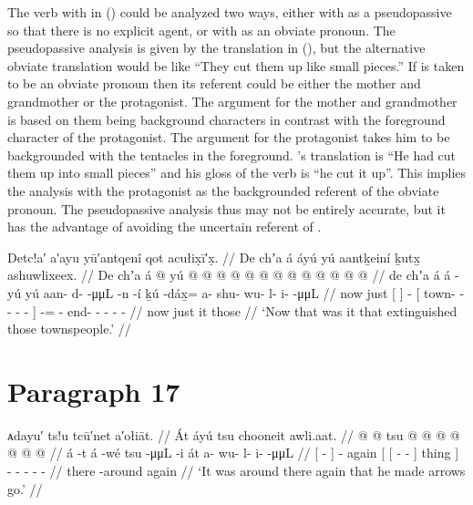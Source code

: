 The verb with  in (\lastx) could be analyzed two ways, either with  as a pseudopassive so that there is no explicit agent, or with  as an obviate pronoun.
The pseudopassive analysis is given by the translation in (\lastx), but the alternative obviate translation would be like “They cut them up like small pieces.”
If  is taken to be an obviate pronoun then its referent could be either the mother and grandmother or the protagonist.
The argument for the mother and grandmother is based on them being background characters in contrast with the foreground character of the protagonist.
The argument for the protagonist takes him to be backgrounded with the tentacles in the foreground.
\citeauthor{swanton:1909}’s translation is “He had cut them up into small pieces” and his gloss of the verb is “he cut it up”.
This implies the analysis with the protagonist as the backgrounded referent of the obviate pronoun.
The pseudopassive analysis thus may not be entirely accurate, but it has the advantage of avoiding the uncertain referent of .

\ex\label{ex:91-222-thats-it-extinguished-townspeople}%
%
\begingl
	\glpreamble	Detc!a′ a′ayu yū′antqenî qot acułix̣ī′x̣. //
	\glpreamble	De chʼa á áyú yú aantḵeiní ḵutx̱ ashuwlixeex. //
	\gla	De chʼa {} á {}  @ {}
		{} yú  @ {} @ {} @ {} @ {} @ {} {}
		 @ {} @  @ {} @ {} @ {} @ {} @ {} @ {} //
	\glb	de chʼa {} á {} á -yú
		{} yú aan- d-  -μμL -n -í {}
		ḵú -dáx̱= a- shu- wu- l- i-  -μμL //
	\glc	now just {}[  {}]  -
		{}[  town- - 
			- - - {}]
		 -= - end- - - -
			 - //
	\gld	now just {} it {}  {}
		{} those  {} {} {} {} {} {}
		 {}  {} {} {} {} {} {} //
	\glft	‘Now that was it that extinguished those townspeople.’
		//
\endgl
\xe

\section{Paragraph 17}\label{sec:91-para-17}

\ex\label{ex:91-223-again-make-arrows-go}%
%
\begingl
	\glpreamble	ᴀdayu′ ts!u tcū′net a′ołiāt. //
	\glpreamble	Át áyú tsu chooneit awli.aat. //
	\gla	{}  @ {} {}  @ {} tsu
		{} {}  @ {} @ {} {} {} {}
		 @ {} @ {} @ {} @ {} @ {} //
	\glb	{} á -t {} á -wé tsu
		{} {}  -μμL -i {} át {}
		a- wu- l- i-  -μμL //
	\glc	{}[  - {}]  - again
		{}[ {}[  - - {}] thing {}]
		- - - -  - //
	\gld	{} there -around {}  {} again
		{} {}  {} {} {} {} {}
		 {} {} {} {} {} //
	\glft	‘It was around there again that he made arrows go.’
		//
\endgl
\xe

